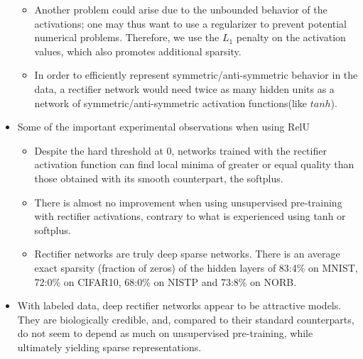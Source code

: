 \documentclass{article}
\begin{document}
\begin{itemize}
\begin{itemize}
        \item Another problem could arise due to the unbounded behavior of the activations; one may thus want to use a regularizer to prevent potential numerical problems. Therefore, we use the $L_1$ penalty on the activation values, which also promotes additional sparsity.
        \item In order to efficiently represent symmetric/anti-symmetric behavior in the data, a rectifier network would need twice as many hidden units as a network of symmetric/anti-symmetric activation functions(like $tanh$).
    \end{itemize}
    \item Some of the important experimental observations when using RelU
    \begin{itemize}
        \item Despite the hard threshold at 0, networks trained with the rectifier activation function can find local minima of greater or equal quality than those obtained with its smooth counterpart, the softplus.
        \item There is almost no improvement when using unsupervised pre-training with rectifier activations, contrary to what is experienced using tanh or softplus. 
        \item Rectifier networks are truly deep sparse networks. There is an average exact sparsity (fraction of zeros) of the hidden layers of 83:4\% on MNIST, 72:0\% on CIFAR10, 68:0\% on NISTP and 73:8\% on NORB.
    \end{itemize}
    \item With labeled data, deep rectifier networks appear to be attractive models. They are biologically credible, and, compared to their standard counterparts, do not seem to depend as much on unsupervised pre-training, while ultimately yielding sparse representations.
\end{itemize}
\end{document}
